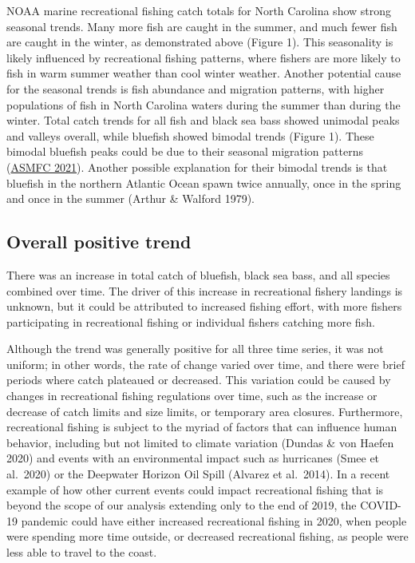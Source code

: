 \documentclass[
  12pt,
]{article}
\begin{document}
NOAA marine recreational fishing catch totals for North Carolina show
strong seasonal trends. Many more fish are caught in the summer, and
much fewer fish are caught in the winter, as demonstrated above (Figure
1). This seasonality is likely influenced by recreational fishing
patterns, where fishers are more likely to fish in warm summer weather
than cool winter weather. Another potential cause for the seasonal
trends is fish abundance and migration patterns, with higher populations
of fish in North Carolina waters during the summer than during the
winter. Total catch trends for all fish and black sea bass showed
unimodal peaks and valleys overall, while bluefish showed bimodal trends
(Figure 1). These bimodal bluefish peaks could be due to their seasonal
migration patterns (\href{http://www.asmfc.org/species/bluefish}{ASMFC
2021}). Another possible explanation for their bimodal trends is that
bluefish in the northern Atlantic Ocean spawn twice annually, once in
the spring and once in the summer (Arthur \& Walford 1979).

\hypertarget{overall-positive-trend}{%
\subsection{Overall positive trend}\label{overall-positive-trend}}

There was an increase in total catch of bluefish, black sea bass, and
all species combined over time. The driver of this increase in
recreational fishery landings is unknown, but it could be attributed to
increased fishing effort, with more fishers participating in
recreational fishing or individual fishers catching more fish.

Although the trend was generally positive for all three time series, it
was not uniform; in other words, the rate of change varied over time,
and there were brief periods where catch plateaued or decreased. This
variation could be caused by changes in recreational fishing regulations
over time, such as the increase or decrease of catch limits and size
limits, or temporary area closures. Furthermore, recreational fishing is
subject to the myriad of factors that can influence human behavior,
including but not limited to climate variation (Dundas \& von Haefen
2020) and events with an environmental impact such as hurricanes (Smee
et al.~2020) or the Deepwater Horizon Oil Spill (Alvarez et al.~2014).
In a recent example of how other current events could impact
recreational fishing that is beyond the scope of our analysis extending
only to the end of 2019, the COVID-19 pandemic could have either
increased recreational fishing in 2020, when people were spending more
time outside, or decreased recreational fishing, as people were less
able to travel to the coast.
\end{document}
